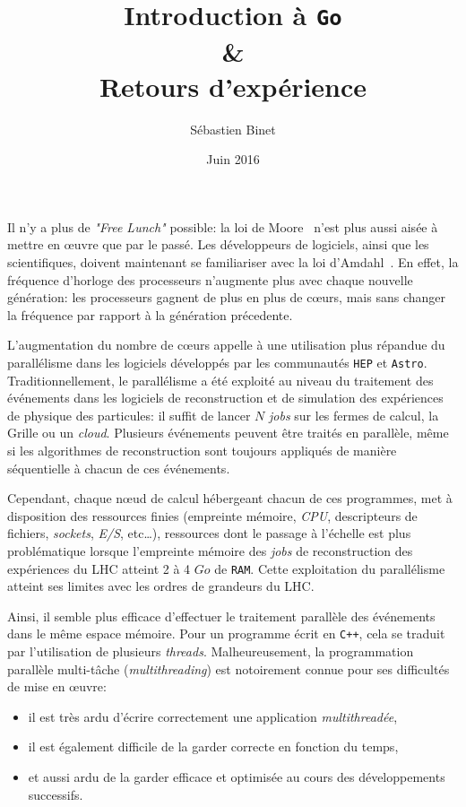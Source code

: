 \documentclass[a4paper,french]{article}
\title{Introduction \`a \texttt{Go}\\ \&\\ Retours d'exp\'erience}
\author{S\'ebastien Binet}
\date{Juin 2016}
\affil{CNRS/IN2P3/LPC}
\begin{document}
\maketitle

\section*{}

Il n'y a plus de \emph{"Free Lunch"} possible: la loi de Moore~\cite{ref-moore}
n'est plus aussi ais\'ee \`a mettre en {\oe}uvre que par le pass\'e.
Les d\'eveloppeurs de logiciels, ainsi que les scientifiques, doivent maintenant
se familiariser avec la loi d'Amdahl~\cite{ref-amdahl}.
En effet, la fr\'equence d'horloge des processeurs n'augmente plus avec chaque
nouvelle g\'en\'eration: les processeurs gagnent de plus en plus de c\oe urs,
mais sans changer la fr\'equence par rapport \`a la g\'en\'eration
pr\'ecedente.

L'augmentation du nombre de c\oe urs appelle \`a une utilisation plus
r\'epandue du parall\'elisme dans les logiciels d\'evelopp\'es par les
communaut\'es \texttt{HEP} et \texttt{Astro}.
Traditionnellement, le parall\'elisme a \'et\'e exploit\'e au niveau du
traitement des \'ev\'enements dans les logiciels de reconstruction et de
simulation des exp\'eriences de physique des particules: il suffit de lancer $N$
\emph{jobs} sur les fermes de calcul, la Grille ou un \emph{cloud}.
Plusieurs \'ev\'enements peuvent \^etre trait\'es en parall\`ele, m\^eme si les
algorithmes de reconstruction sont toujours appliqu\'es de mani\`ere
s\'equentielle \`a chacun de ces \'ev\'enements.

Cependant, chaque n\oe ud de calcul h\'ebergeant chacun de ces programmes, met \`a
disposition des ressources finies (empreinte m\'emoire, \emph{CPU}, descripteurs
de fichiers, \emph{sockets}, \emph{E/S}, etc\ldots), ressources dont le passage \`a
l'\'echelle est plus probl\'ematique lorsque l'empreinte m\'emoire des \emph{jobs} de
reconstruction des exp\'eriences du LHC atteint 2 \`a 4 $Go$ de \texttt{RAM}.
Cette exploitation du parall\'elisme atteint ses limites avec les
ordres de grandeurs du LHC.

Ainsi, il semble plus efficace d'effectuer le traitement parall\`ele des
\'ev\'enements dans le m\^eme espace m\'emoire.
Pour un programme \'ecrit en \texttt{C++}, cela se traduit par l'utilisation de
plusieurs \emph{threads}.
Malheureusement, la programmation parall\`ele multi-t\^ache
(\emph{multithreading}) est notoirement connue pour ses difficult\'es de mise en
\oe uvre:
\begin{itemize}
	\item il est tr\`es ardu d'\'ecrire correctement une application \emph{multithread\'ee},
	\item il est \'egalement difficile de la garder correcte en fonction du
		temps,
	\item et aussi ardu de la garder efficace et optimis\'ee au cours des
		d\'eveloppements successifs.
\end{itemize}
\end{document}
